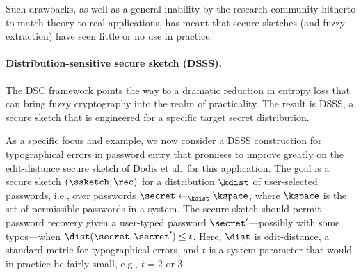 Such drawbacks, as well as a general inability by the research community hitherto to match theory to real applications, has meant that secure sketches (and fuzzy extraction) have seen little or no use in practice.

\paragraph{Distribution-sensitive secure sketch (DSSS).} The DSC framework
points the way to a dramatic reduction in entropy loss that can bring fuzzy
cryptography into the realm of practicality. The result is DSSS, a secure sketch
that is engineered for a specific target secret distribution.

As a specific focus and example, we now consider a DSSS construction for
typographical errors in password entry that promises to improve greatly on the edit-distance secure sketch of Dodis et al.~for this application. The goal is a secure sketch
$(\ssketch, \rec)$ for a distribution $\kdist$ of user-selected passwords, i.e.,
over passwords $\secret \leftarrow_{\kdist} \kspace$, where $\kspace$ is the set of
permissible passwords in a system. The secure sketch should permit password
recovery given a user-typed password $\secret'$---possibly with some typos---when
$\dist(\secret, \secret') \leq t$. Here, $\dist$ is edit-distance, a standard metric
for typographical errors, and $t$ is a system parameter that would in practice
  be fairly small, e.g., $t = 2$ or $3$. 

\iffalse
As noted above, the edit-distance secure sketches outlined in~\cite{DORS08}
produce an average min-entropy entropy loss potentially greater than that of
real passwords. The reason is that these secure sketch constructions are
agnostic to underlying message distributions.
\fi

